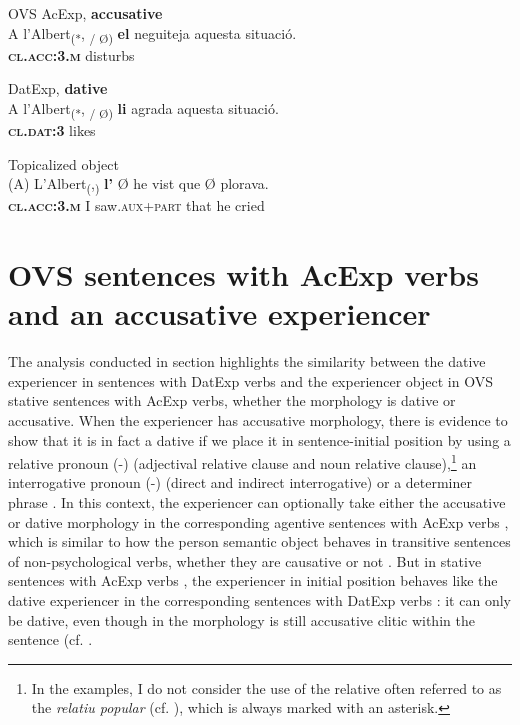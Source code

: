 \documentclass[output=paper,colorlinks,citecolor=brown,nonflat,modfonts]{langsci/langscibook}
\begin{document}
 \ex OVS AcExp, \textbf{accusative}\label{ex:royo:13b}\\
 \gll A l’Albert\textsubscript{(*}, \textsubscript{/ Ø)} \textbf{el} neguiteja aquesta situació.\\
  \textbf{\textsc{cl.acc:3.m}} disturbs \\
\glt {}
 
 \ex DatExp, \textbf{dative}\label{ex:royo:13c}\\
 \gll A l’Albert\textsubscript{(*}, \textsubscript{/ Ø)} \textbf{li} agrada aquesta situació.\\
  \textbf{\textsc{cl.dat:3}} likes \\
\glt {}
 
 \ex Topicalized object\label{ex:royo:13d}\\
 \gll (A) L’Albert\textsubscript{(},\textsubscript{)} \textbf{l’} Ø he vist que Ø plorava.\\
 \textbf{\textsc{cl.acc:3.m}} I saw.\textsc{aux+part} that he cried \\
\glt {}
 \z
 \z


\section{OVS sentences with AcExp verbs and an accusative experiencer}\label{sec:royo:4}

The analysis conducted in section  highlights the similarity between the dative experiencer in sentences with DatExp verbs and the experiencer object in OVS stative sentences with AcExp verbs, whether the morphology is dative or accusative. When the experiencer has accusative morphology, there is evidence to show that it is in fact a dative if we place it in sentence-initial position by using a relative pronoun (-) (adjectival relative clause and noun relative clause),\footnote{In the examples, I do not consider the use of the relative often referred to as the \textit{relatiu popular} (cf. \citealt[154--155]{Ginebra2005}), which is always marked with an asterisk.} an interrogative pronoun (-) (direct and indirect interrogative) or a determiner phrase . In this context, the experiencer can optionally take either the accusative or dative morphology in the corresponding agentive sentences with AcExp verbs , which is similar to how the person semantic object behaves in transitive sentences of non-psychological verbs, whether they are causative or not . But in stative sentences with AcExp verbs , the experiencer in initial position behaves like the dative experiencer in the corresponding sentences with DatExp verbs : it can only be dative, even though in  the morphology is still accusative clitic within the sentence (cf. \citealt[Section 4.3.4]{Royo2017}.
\end{document}
